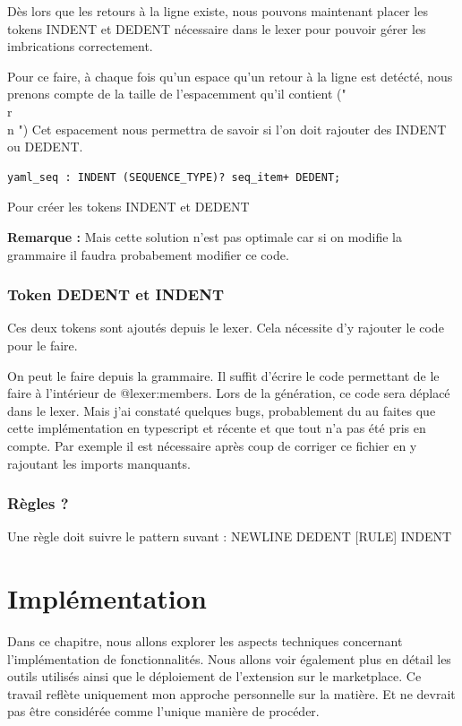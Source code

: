 \documentclass[
    iict, %
    il, %
]{heig-tb}
\begin{document}
Dès lors que les retours à la ligne existe, nous pouvons maintenant placer les tokens INDENT et DEDENT nécessaire dans le lexer
pour pouvoir gérer les imbrications correctement.

Pour ce faire, à chaque fois qu'un espace qu'un retour à la ligne est detécté, nous prenons compte de la taille de l'espacemment qu'il contient ("\\r\\n    ")
Cet espacement nous permettra de savoir si l'on doit rajouter des INDENT ou DEDENT.


\begin{lstlisting}[frame=single,caption={generator-code},label={generator-code}]
    yaml_seq : INDENT (SEQUENCE_TYPE)? seq_item+ DEDENT;
\end{lstlisting}

Pour créer les tokens INDENT et DEDENT


\textbf{Remarque : } Mais cette solution n'est pas optimale car si on modifie la grammaire il faudra probabement modifier ce code.

\subsection{Token DEDENT et INDENT}
Ces deux tokens sont ajoutés depuis le lexer. Cela nécessite d'y rajouter le code pour le faire.

On peut le faire depuis la grammaire. Il suffit d'écrire le code permettant de le faire à l'intérieur de @lexer:members{}.
Lors de la génération, ce code sera déplacé dans le lexer.
Mais j'ai constaté quelques bugs, probablement du au faites que cette implémentation en typescript et récente et que tout n'a pas été pris en compte.
Par exemple il est nécessaire après coup de corriger ce fichier en y rajoutant les imports manquants.

\subsection{Règles ?}
Une règle doit suivre le pattern suvant : NEWLINE DEDENT [RULE] INDENT

\chapter{Implémentation}
Dans ce chapitre, nous allons explorer les aspects techniques concernant l'implémentation de fonctionnalités. Nous allons voir également plus en détail les outils utilisés ainsi que le déploiement de l'extension sur le marketplace.
Ce travail reflète uniquement mon approche personnelle sur la matière. Et ne devrait pas être considérée comme l'unique manière de procéder.
\end{document}
